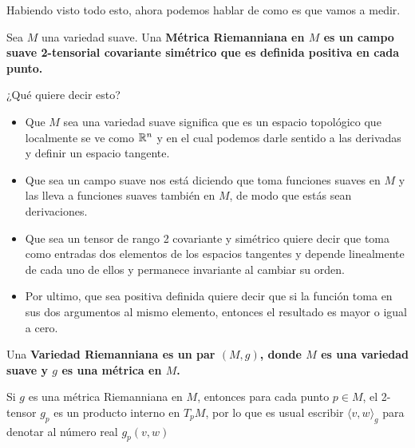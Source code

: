 \begin{frame}
  Habiendo visto todo esto, ahora podemos hablar de como es que vamos a medir. \pause

  \begin{definition}
    Sea $M$ una variedad suave. Una \bf{Métrica Riemanniana} en $M$ es un campo suave 2-tensorial covariante simétrico que es definida positiva en cada punto.
  \end{definition} \pause

  ¿Qué quiere decir esto?
\end{frame}

\begin{frame}
  \begin{itemize}
    \item  Que $M$ sea una variedad suave significa que es un espacio topológico que localmente se ve como $\Bbb{R}^n$ y en el cual podemos darle sentido a las derivadas y definir un espacio tangente. \pause
    \item Que sea un campo suave nos está diciendo que toma funciones suaves en $M$ y las lleva a funciones suaves también en $M$, de modo que estás sean derivaciones. \pause
    \item Que sea un tensor de rango 2 covariante y simétrico quiere decir que toma como entradas dos elementos de los espacios tangentes y depende linealmente de cada uno de ellos y permanece invariante al cambiar su orden. \pause
    \item Por ultimo, que sea positiva definida quiere decir que si la función toma en sus dos argumentos al mismo elemento, entonces el resultado es mayor o igual a cero.
  \end{itemize}
\end{frame}

\begin{frame}
  \begin{definition}
    Una \bf{Variedad Riemanniana} es un par $(M,g)$, donde $M$ es una variedad suave y $g$ es una métrica en $M$.
  \end{definition}

  Si $g$ es una métrica Riemanniana en $M$, entonces para cada punto $p \in M$, el 2-tensor $g_p$ es un producto interno en $T_p M$, por lo que es usual escribir $\langle v,w \rangle_g$ para denotar al número real $g_p (v,w)$
\end{frame}

